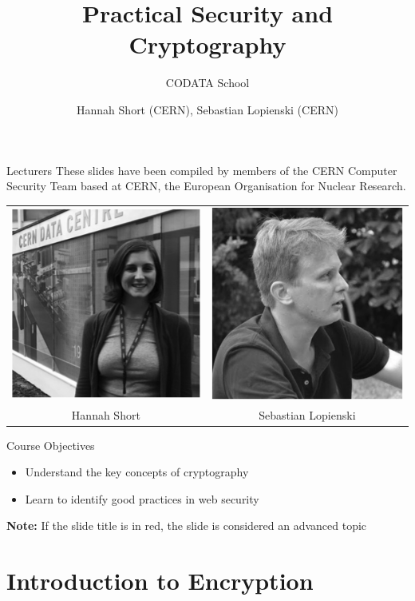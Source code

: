 \documentclass{beamer}
\author{Hannah Short (CERN), Sebastian Lopienski (CERN)}
\title{Practical Security and Cryptography}
\subtitle{CODATA School}
\begin{document}
\frontcover

\frame{\titlepage}

\begin{frame}{Lecturers}
These slides have been compiled by members of the CERN Computer Security Team based at CERN, the European Organisation for Nuclear Research.
\begin{center}
\begin{tabular}{ c c  }
 \includegraphics[width=0.2\linewidth]{lecturer1.png} & \includegraphics[width=0.2\linewidth]{Lecturer2.png}  \\ 
 Hannah Short & Sebastian Lopienski  \\  
\end{tabular}
\end{center}
\end{frame}

\frame{\tableofcontents}

\begin{frame}{Course Objectives}
	\begin{itemize}
		\item Understand the key concepts of cryptography
		\item Learn to identify good practices in web security
	\end{itemize}
\textbf{Note:} \newline
\textit{}{If the slide title is in {\color{red}red}, the slide is considered an advanced topic}
\end{frame}

\section{Introduction to Encryption}
\frame{\sectionpage}
\end{document}
